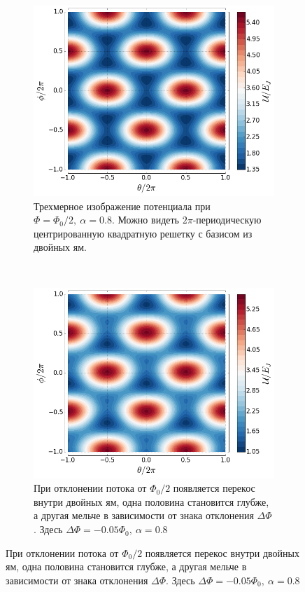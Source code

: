 \documentclass[12pt, twoside]{report}
\numberwithin{equation}{section}
\numberwithin{figure}{section}
\begin{document}
\begin{figure}[!p]

\begingroup
\captionsetup[subfigure]{width=0.9\textwidth, justification=normal}
\centering
\begin{subfigure}[t]{0.49\linewidth}
\centering
\includegraphics[height = .8\textwidth]{Pictures/qubit_potential}
\caption{Трехмерное изображение потенциала при $\Phi = \Phi_0/2,\ \alpha=0.8$. Можно видеть $2\pi$-периодическую центрированную квадратную решетку с базисом из двойных ям.}
\label{fig:U3d}
\end{subfigure}~
\begin{subfigure}[t]{0.49\linewidth}
\centering
\includegraphics[height = .8\textwidth]{Pictures/qubit_potential2}
\caption{При отклонении потока от $\Phi_0/2$ появляется перекос внутри двойных ям, одна половина становится глубже, а другая мельче в зависимости от знака отклонения $\Delta\Phi$. Здесь $\Delta\Phi=-0.05\Phi_0,\ \alpha=0.8$}
\label{fig:U3d2}
\end{subfigure}


\end{figure}
\end{document}
